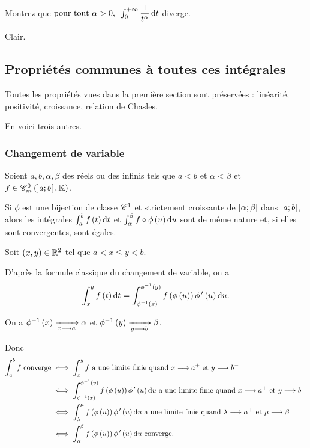 \begin{exo}
Montrez que \(\quantifs{\tpt\alpha>0}\int_0^{\pinf}\dfrac{1}{t^\alpha}\odif{t}\) diverge.
\end{exo}

\begin{corr}
Clair.
\end{corr}

\subsection{Propriétés communes à toutes ces intégrales}

Toutes les propriétés vues dans la première section sont préservées : linéarité, positivité, croissance, relation de Chasles.

En voici trois autres.

\subsubsection{Changement de variable}

\begin{prop}
Soient \(a,b,\alpha,\beta\) des réels ou des infinis tels que \(a<b\) et \(\alpha<\beta\) et \(f\in\contm[\intervee{a}{b}]\).

Si \(\phi\) est une bijection de classe \(\mathscr{C}^{1}\) et strictement croissante de \(\left]\alpha;\beta\right[\) dans \(\left]a;b\right[\), alors les intégrales \(\int_a^bf\paren{t}\odif{t}\) et \(\int_\alpha^\beta f\rond\phi\paren{u}\odif{u}\) sont de même nature et, si elles sont convergentes, sont égales.
\end{prop}

\begin{dem}
Soit \(\left(x,y\right)\in\mathbb{R}^2\) tel que \(a<x\leq y<b\).

D'après la formule classique du changement de variable, on a \[\int_x^yf\paren{t}\odif{t}=\int_{\phi\inv\paren{x}}^{\phi\inv\paren{y}}f\paren{\phi\paren{u}}\phi\prim\paren{u}\odif{u}.\]

On a \(\phi^{-1}\left(x\right)\xrightarrow[x\longrightarrow a]{}\alpha\) et \(\phi^{-1}\left(y\right)\xrightarrow[y\longrightarrow b]{}\beta\).

Donc \[\begin{aligned}
\int_a^bf\text{ converge}&\ssi\int_x^yf\text{ a une limite finie quand }x\to a^+\text{ et }y\to b^- \\
&\ssi\int_{\phi\inv\paren{x}}^{\phi\inv\paren{y}}f\paren{\phi\paren{u}}\phi\prim\paren{u}\odif{u}\text{ a une limite finie quand }x\to a^+\text{ et }y\to b^- \\
&\ssi\int_\lambda^\mu f\paren{\phi\paren{u}}\phi\prim\paren{u}\odif{u}\text{ a une limite finie quand }\lambda\to\alpha^+\text{ et }\mu\to\beta^- \\
&\ssi\int_\alpha^\beta f\paren{\phi\paren{u}}\phi\prim\paren{u}\odif{u}\text{ converge}.
\end{aligned}\]
\end{dem}

